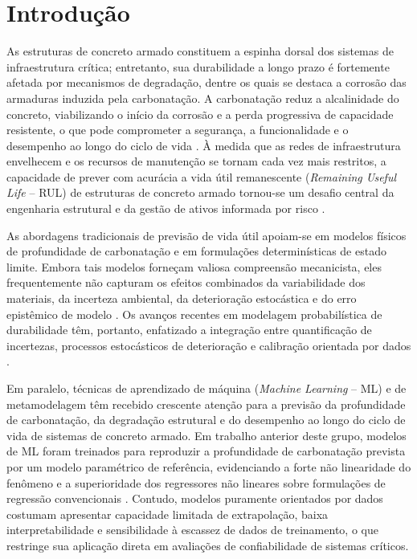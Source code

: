 \section{Introdu\c{c}\~ao}\label{sec:intro}


As estruturas de concreto armado constituem a espinha dorsal dos sistemas de infraestrutura crítica; entretanto, sua durabilidade a longo prazo é fortemente afetada por mecanismos de degradação, dentre os quais se destaca a corrosão das armaduras induzida pela carbonatação. A carbonatação reduz a alcalinidade do concreto, viabilizando o início da corrosão e a perda progressiva de capacidade resistente, o que pode comprometer a segurança, a funcionalidade e o desempenho ao longo do ciclo de vida \parencite{tuutti1982, possan2010}. À medida que as redes de infraestrutura envelhecem e os recursos de manutenção se tornam cada vez mais restritos, a capacidade de prever com acurácia a vida útil remanescente (\textit{Remaining Useful Life} -- RUL) de estruturas de concreto armado tornou-se um desafio central da engenharia estrutural e da gestão de ativos informada por risco \parencite{ellingwood2005, frangopol2011, si2011}.

As abordagens tradicionais de previsão de vida útil apoiam-se em modelos físicos de profundidade de carbonatação e em formulações determinísticas de estado limite. Embora tais modelos forneçam valiosa compreensão mecanicista, eles frequentemente não capturam os efeitos combinados da variabilidade dos materiais, da incerteza ambiental, da deterioração estocástica e do erro epistêmico de modelo \parencite{possan2010, melchers2018}. Os avanços recentes em modelagem probabilística de durabilidade têm, portanto, enfatizado a integração entre quantificação de incertezas, processos estocásticos de deterioração e calibração orientada por dados \parencite{jcss2001, fib2006}.

Em paralelo, técnicas de aprendizado de máquina (\textit{Machine Learning} -- ML) e de metamodelagem têm recebido crescente atenção para a previsão da profundidade de carbonatação, da degradação estrutural e do desempenho ao longo do ciclo de vida de sistemas de concreto armado. Em trabalho anterior deste grupo, modelos de ML foram treinados para reproduzir a profundidade de carbonatação prevista por um modelo paramétrico de referência, evidenciando a forte não linearidade do fenômeno e a superioridade dos regressores não lineares sobre formulações de regressão convencionais \parencite{couto2025}. Contudo, modelos puramente orientados por dados costumam apresentar capacidade limitada de extrapolação, baixa interpretabilidade e sensibilidade à escassez de dados de treinamento, o que restringe sua aplicação direta em avaliações de confiabilidade de sistemas críticos.

